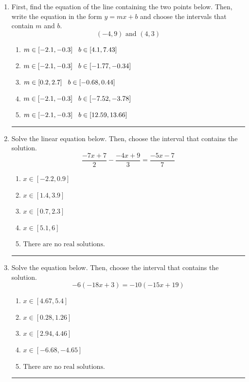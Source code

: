 \documentclass[14pt]{extbook}
\newcommand{\litem}[1]{\item#1\hspace*{-1cm}\rule{\textwidth}{0.4pt}}
\begin{document}
\begin{enumerate}
{\begin{enumerate}[label=\Alph*.]
\end{enumerate} }
\litem{
First, find the equation of the line containing the two points below. Then, write the equation in the form $ y=mx+b $ and choose the intervals that contain $m$ and $b$.\[ (-4, 9) \text{ and } (4, 3) \]\begin{enumerate}[label=\Alph*.]
\item \( m \in [-2.1, -0.3] \hspace*{3mm} b \in [4.1, 7.43] \)
\item \( m \in [-2.1, -0.3] \hspace*{3mm} b \in [-1.77, -0.34] \)
\item \( m \in [0.2, 2.7] \hspace*{3mm} b \in [-0.68, 0.44] \)
\item \( m \in [-2.1, -0.3] \hspace*{3mm} b \in [-7.52, -3.78] \)
\item \( m \in [-2.1, -0.3] \hspace*{3mm} b \in [12.59, 13.66] \)

\end{enumerate} }
\litem{
Solve the linear equation below. Then, choose the interval that contains the solution.\[ \frac{-7x + 7}{2} - \frac{-4x + 9}{3} = \frac{-5x -7}{7} \]\begin{enumerate}[label=\Alph*.]
\item \( x \in [-2.2, 0.9] \)
\item \( x \in [1.4, 3.9] \)
\item \( x \in [0.7, 2.3] \)
\item \( x \in [5.1, 6] \)
\item \( \text{There are no real solutions.} \)

\end{enumerate} }
\litem{
Solve the equation below. Then, choose the interval that contains the solution.\[ -6(-18x + 3) = -10(-15x + 19) \]\begin{enumerate}[label=\Alph*.]
\item \( x \in [4.67, 5.4] \)
\item \( x \in [0.28, 1.26] \)
\item \( x \in [2.94, 4.46] \)
\item \( x \in [-6.68, -4.65] \)
\item \( \text{There are no real solutions.} \)


\end{enumerate}}
\end{enumerate}
\end{document}
